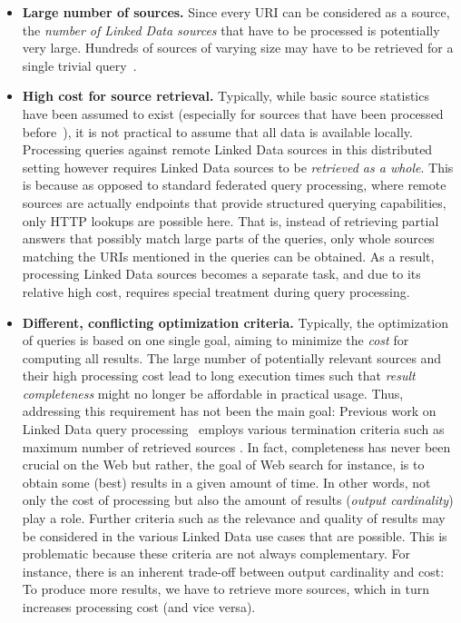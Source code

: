 \begin{itemize}
\item \textbf{Large number of sources.} Since every URI can be
  considered as a source, the \emph{number of Linked Data sources}
  that have to be processed is potentially very large. Hundreds of
  sources of varying size may have to be retrieved for a single
  trivial query~\cite{ladwig_linked_2010}.

\item \textbf{High cost for source retrieval.} Typically, while basic
  source statistics have been assumed to exist (especially for sources
  that have been processed before~\cite{ladwig_linked_2010}), it is
  not practical to assume that all data is available
  locally. Processing queries against remote Linked Data sources in
  this distributed setting however requires Linked Data sources to be
  \emph{retrieved as a whole}. This is because as opposed to standard
  federated query processing, where remote sources are actually
  endpoints that provide structured querying capabilities, only HTTP
  lookups are possible here. That is, instead of retrieving partial
  answers that possibly match large parts of the queries, only whole
  sources matching the URIs mentioned in the queries can be
  obtained. As a result, processing Linked Data sources becomes a
  separate task, and due to its relative high cost, requires special
  treatment during query processing.

\item \textbf{Different, conflicting optimization criteria.}
  Typically, the optimization of queries is based on one single goal,
  aiming to minimize the \emph{cost} for computing all results. The
  large number of potentially relevant sources and their high
  processing cost lead to long execution times such that \emph{result
    completeness} might no longer be affordable in practical
  usage. Thus, addressing this requirement has not been the main goal:
  Previous work on Linked Data query
  processing~\cite{hartig_executing_2009,harth_data_2010,ladwig_linked_2010}
  employs various termination criteria such as maximum number of
  retrieved sources \cite{harth_data_2010}. In fact, completeness has
  never been crucial on the Web but rather, the goal of Web search for
  instance, is to obtain some (best) results in a given amount of
  time. In other words, not only the cost of processing but also the
  amount of results (\emph{output cardinality}) play a role. Further
  criteria such as the relevance and quality of results may be
  considered in the various Linked Data use cases that are
  possible. This is problematic because these criteria are not always
  complementary. For instance, there is an inherent trade-off between
  output cardinality and cost: To produce more results, we have to
  retrieve more sources, which in turn increases processing cost (and
  vice versa).
\end{itemize}


